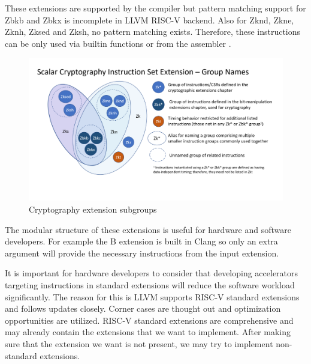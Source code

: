 These extensions are supported by the compiler but pattern matching support for Zbkb and Zbkx is incomplete in LLVM RISC-V backend. Also for Zknd, Zkne, Zknh, Zksed and Zksh, no pattern matching exists. Therefore, these instructions can be only used via builtin functions or from the assembler \cite{llvmextensionspage}.

\begin{figure}
    \centering
    \includegraphics{riscv/cryptography_extension_subgroups.png}
    \caption{Cryptography extension subgroups \cite{cryptogroupsdiag}}
    \label{fig:cryptography_extension_subgroups}
\end{figure}

The modular structure of these extensions is useful for hardware and software developers. For example the B extension is built in Clang so only an extra argument will provide the necessary instructions from the input extension.

It is important for hardware developers to consider that developing accelerators targeting instructions in standard extensions will reduce the software workload significantly. The reason for this is LLVM supports RISC-V standard extensions and follows updates closely. Corner cases are thought out and optimization opportunities are utilized. RISC-V standard extensions are comprehensive and may already contain the extensions that we want to implement. After making sure that the extension we want is not present, we may try to implement non-standard extensions.
